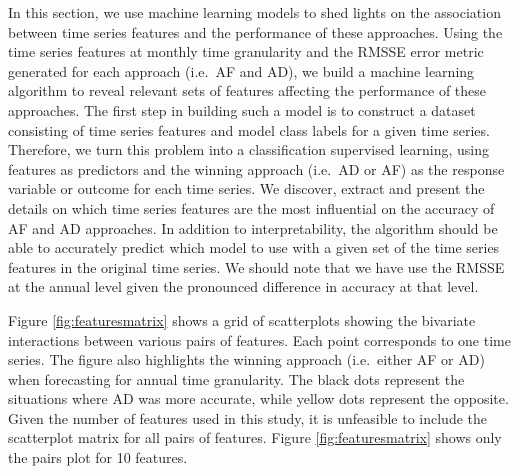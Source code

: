 \documentclass[]{elsarticle} %
\begin{document}
In this section, we use machine learning models to shed lights on the
association between time series features and the performance of these
approaches. Using the time series features at monthly time granularity
and the RMSSE error metric generated for each approach (i.e.~AF and AD),
we build a machine learning algorithm to reveal relevant sets of
features affecting the performance of these approaches. The first step
in building such a model is to construct a dataset consisting of time
series features and model class labels for a given time series.
Therefore, we turn this problem into a classification supervised
learning, using features as predictors and the winning approach (i.e.~AD
or AF) as the response variable or outcome for each time series. We
discover, extract and present the details on which time series features
are the most influential on the accuracy of AF and AD approaches. In
addition to interpretability, the algorithm should be able to accurately
predict which model to use with a given set of the time series features
in the original time series. We should note that we have use the RMSSE
at the annual level given the pronounced difference in accuracy at that
level.

Figure \ref{fig:featuresmatrix} shows a grid of scatterplots showing the
bivariate interactions between various pairs of features. Each point
corresponds to one time series. The figure also highlights the winning
approach (i.e.~either AF or AD) when forecasting for annual time
granularity. The black dots represent the situations where AD was more
accurate, while yellow dots represent the opposite. Given the number of
features used in this study, it is unfeasible to include the scatterplot
matrix for all pairs of features. Figure \ref{fig:featuresmatrix} shows
only the pairs plot for 10 features.
\end{document}

